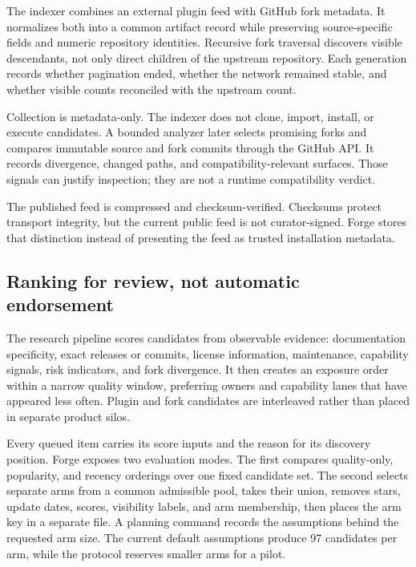 \documentclass[10pt,twocolumn]{article}
\begin{document}
The indexer combines an external plugin feed with GitHub fork metadata. It normalizes both into a common artifact record while preserving source-specific fields and numeric repository identities. Recursive fork traversal discovers visible descendants, not only direct children of the upstream repository. Each generation records whether pagination ended, whether the network remained stable, and whether visible counts reconciled with the upstream count.\cite{registry}

Collection is metadata-only. The indexer does not clone, import, install, or execute candidates. A bounded analyzer later selects promising forks and compares immutable source and fork commits through the GitHub API. It records divergence, changed paths, and compatibility-relevant surfaces. Those signals can justify inspection; they are not a runtime compatibility verdict.

The published feed is compressed and checksum-verified. Checksums protect transport integrity, but the current public feed is not curator-signed. Forge stores that distinction instead of presenting the feed as trusted installation metadata.\cite{feedrelease}

\subsection{Ranking for review, not automatic endorsement}

The research pipeline scores candidates from observable evidence: documentation specificity, exact releases or commits, license information, maintenance, capability signals, risk indicators, and fork divergence. It then creates an exposure order within a narrow quality window, preferring owners and capability lanes that have appeared less often. Plugin and fork candidates are interleaved rather than placed in separate product silos.\cite{research}

Every queued item carries its score inputs and the reason for its discovery position. Forge exposes two evaluation modes. The first compares quality-only, popularity, and recency orderings over one fixed candidate set. The second selects separate arms from a common admissible pool, takes their union, removes stars, update dates, scores, visibility labels, and arm membership, then places the arm key in a separate file. A planning command records the assumptions behind the requested arm size. The current default assumptions produce 97 candidates per arm, while the protocol reserves smaller arms for a pilot.
\end{document}
